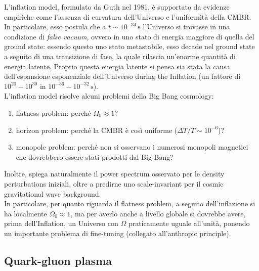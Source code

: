 L'inflation model, formulato da Guth nel 1981, è supportato da evidenze empiriche come l'assenza di curvatura dell'Universo e l'uniformità della CMBR. In particolare, esso postula che a $ t \sim 10^{-34} \,\text{s} $ l'Universo si trovasse in una condizione di \textit{false vacuum}, ovvero in uno stato di energia maggiore di quella del ground state: essendo questo uno stato metastabile, esso decade nel ground state a seguito di una transizione di fase, la quale rilascia un'enorme quantità di energia latente. Proprio questa energia latente si pensa sia stata la causa dell'espansione esponenziale dell'Universo during the Inflation (un fattore di $ 10^{20} - 10^{30} $ in $ 10^{-36} - 10^{-32} \,\text{s} $).\\
L'inflation model risolve alcuni problemi della Big Bang cosmology:
\begin{enumerate}
	\item flatness problem: perché $ \Omega_0 \approx 1 $?
	\item horizon problem: perché la CMBR è così uniforme ($ \Delta T / T \sim 10^{-6} $)?
	\item monopole problem: perché non si osservano i numerosi monopoli magnetici che dovrebbero essere stati prodotti dal Big Bang?
\end{enumerate}
Inoltre, spiega naturalmente il power spectrum osservato per le density perturbations iniziali, oltre a predirne uno scale-invariant per il cosmic gravitational wave background.\\
In particolare, per quanto riguarda il flatness problem, a seguito dell'inflazione si ha localmente $ \Omega_0 \approx 1 $, ma per averlo anche a livello globale si dovrebbe avere, prima dell'Inflation, un Universo con $ \Omega $ praticamente uguale all'unità, ponendo un importante problema di fine-tuning (collegato all'anthropic principle).

\subsection{Quark-gluon plasma}

